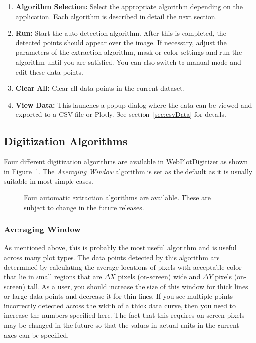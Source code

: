 \documentclass[letterpaper, 11pt]{article}
\begin{document}
\begin{enumerate}
\begin{enumerate}
\end{enumerate}
\item{{\bf Algorithm Selection: }Select the appropriate algorithm depending on the application. Each algorithm is described in detail the next section.}
\item{{\bf Run: }Start the auto-detection algorithm. After this is completed, the detected points should appear over the image. If necessary, adjust the parameters of the extraction algorithm, mask or color settings and run the algorithm until you are satisfied. You can also switch to manual mode and edit these data points.}
\item{{\bf Clear All: }Clear all data points in the current dataset.}
\item{{\bf View Data: }This launches a popup dialog where the data can be viewed and exported to a CSV file or Plotly. See section~\ref{sec:csvData} for details.}
\end{enumerate}

\subsection{Digitization Algorithms}
Four different digitization algorithms are available in WebPlotDigitizer as shown in Figure~\ref{fig:autoExtractAlgos}. The \emph{Averaging Window} algorithm is set as the default as it is usually suitable in most simple cases.

\begin{figure}
\begin{center}
\caption{Four automatic extraction algorithms are available. These are subject to change in the future releases.}
\label{fig:autoExtractAlgos}
\end{center}
\end{figure}

\subsubsection{Averaging Window}
As mentioned above, this is probably the most useful algorithm and is useful across many plot types. The data points detected by this algorithm are determined by calculating the average locations of pixels with acceptable color that lie in small regions that are $\Delta X$ pixels (on-screen) wide and $\Delta Y$ pixels (on-screen) tall. As a user, you should increase the size of this window for thick lines or large data points and decrease it for thin lines. If you see multiple points incorrectly detected across the width of a thick data curve, then you need to increase the numbers specified here. The fact that this requires on-screen pixels may be changed in the future so that the values in actual units in the current axes can be specified.
\end{document}

